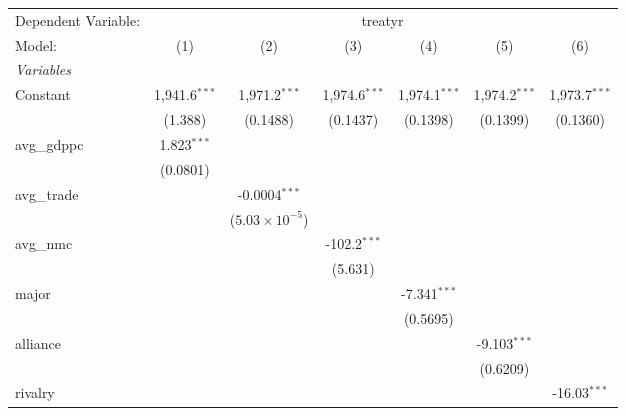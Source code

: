 


\begingroup
\centering
\begin{tabular}{lcccccc}
   \tabularnewline \midrule \midrule
   Dependent Variable: & \multicolumn{6}{c}{treatyr}\\
   Model:         & (1)             & (2)                     & (3)             & (4)             & (5)             & (6)\\  
   \midrule
   \emph{Variables}\\
   Constant       & 1,941.6$^{***}$ & 1,971.2$^{***}$         & 1,974.6$^{***}$ & 1,974.1$^{***}$ & 1,974.2$^{***}$ & 1,973.7$^{***}$\\   
                  & (1.388)         & (0.1488)                & (0.1437)        & (0.1398)        & (0.1399)        & (0.1360)\\   
   avg\_gdppc     & 1.823$^{***}$   &                         &                 &                 &                 &   \\   
                  & (0.0801)        &                         &                 &                 &                 &   \\   
   avg\_trade     &                 & -0.0004$^{***}$         &                 &                 &                 &   \\   
                  &                 & ($5.03\times 10^{-5}$)  &                 &                 &                 &   \\   
   avg\_nmc       &                 &                         & -102.2$^{***}$  &                 &                 &   \\   
                  &                 &                         & (5.631)         &                 &                 &   \\   
   major          &                 &                         &                 & -7.341$^{***}$  &                 &   \\   
                  &                 &                         &                 & (0.5695)        &                 &   \\   
   alliance       &                 &                         &                 &                 & -9.103$^{***}$  &   \\   
                  &                 &                         &                 &                 & (0.6209)        &   \\   
   rivalry        &                 &                         &                 &                 &                 & -16.03$^{***}$\\   

\end{tabular}
